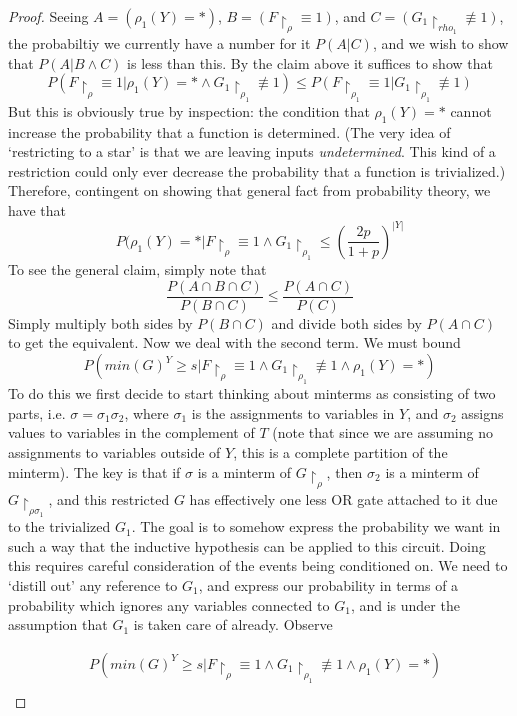 \begin{proof}
Seeing $A = (\rho_1(Y) = *)$, $B = (F \restriction_{\rho} \equiv 1)$, and $C = (G_1 \restriction_{rho_1} \not\equiv 1)$, the probabiltiy we currently have a number for it $P(A|C)$, and we wish to show that $P(A|B \wedge C)$ is less than this. By the claim above it suffices to show that
\[ P(F \restriction_{\rho} \equiv 1 | \rho_1(Y) = * \wedge G_1\restriction_{\rho_1} \not\equiv 1) \leq P(F \restriction_{\rho_1} \equiv 1 | G_1 \restriction_{\rho_1} \not\equiv 1) \]
But this is obviously true by inspection: the condition that $\rho_1(Y) = *$ cannot increase the probability that a function is determined. (The very idea of `restricting to a star' is that we are leaving inputs \emph{undetermined}. This kind of a restriction could only ever decrease the probability that a function is trivialized.) Therefore, contingent on showing that general fact from probability theory, we have that 
\[ P(\rho_1(Y) = *|F \restriction_{\rho} \equiv 1 \wedge G_1 \restriction_{\rho_1} 
\leq \left( \frac{2p}{1+p} \right)^{|Y|} \]
To see the general claim, simply note that
\[ \frac{P(A \cap B \cap C)}{P(B \cap C)} \leq \frac{P(A \cap C)}{P(C)} \]
Simply multiply both sides by $P(B \cap C)$ and divide both sides by $P(A \cap C)$ to get the equivalent. Now we deal with the second term. We must bound
\[ P(min(G)^Y \geq s | F \restriction_{\rho} \equiv 1 \wedge G_1 \restriction_{\rho_1} \not\equiv 1 \wedge \rho_1(Y) = *) \]
To do this we first decide to start thinking about minterms as consisting of two parts, i.e. $\sigma = \sigma_1\sigma_2$, where $\sigma_1$ is the assignments to variables in $Y$, and $\sigma_2$ assigns values to variables in the complement of $T$ (note that since we are assuming no assignments to variables outside of $Y$, this is a complete partition of the minterm). The key is that if $\sigma$ is a minterm of $G \restriction_{\rho}$, then $\sigma_2$ is a minterm of $G \restriction_{\rho \sigma_1}$, and this restricted $G$ has effectively one less OR gate attached to it due to the trivialized $G_1$. The goal is to somehow express the probability we want in such a way that the inductive hypothesis can be applied to this circuit. Doing this requires careful consideration of the events being conditioned on. We need to `distill out' any reference to $G_1$, and express our probability in terms of a probability which ignores any variables connected to $G_1$, and is under the assumption that $G_1$ is taken care of already. Observe \par 
\begin{align*}
	 & P(min(G)^Y \geq s | F \restriction_{\rho} \equiv 1 \wedge G_1 \restriction_{\rho_1} \not\equiv 1 \wedge \rho_1(Y) = *)  \\

\end{align*}
\end{proof}
